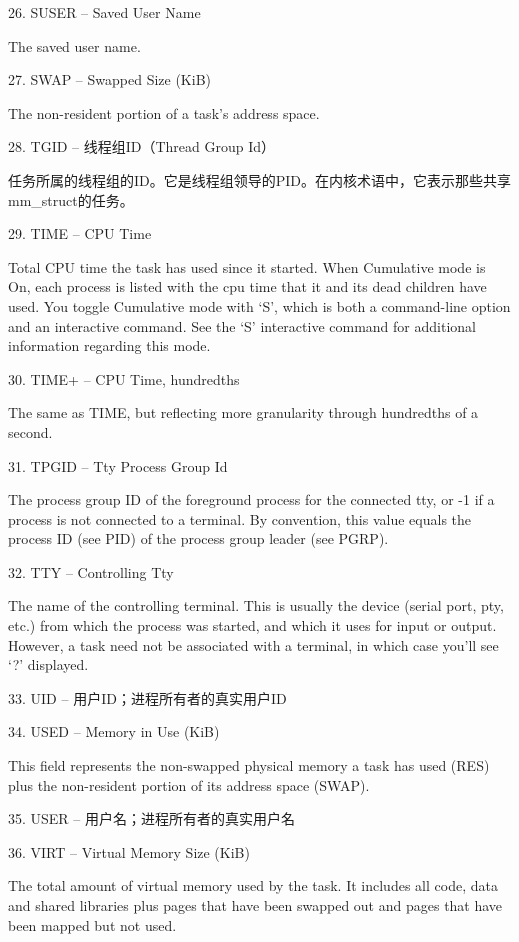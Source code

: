 26. SUSER  --  Saved User Name  \par
The saved user name.

27. SWAP  --  Swapped Size (KiB)    \par
The non-resident portion of a task's address space.

28. TGID  --  线程组ID（Thread Group Id） \par
\qquad 任务所属的线程组的ID。它是线程组领导的PID。在内核术语中，它表示那些共享mm\_struct的任务。

29. TIME  --  CPU Time  \par
Total CPU time the task has used since it started.  When Cumulative mode is On, each process is listed with the cpu time that it and its dead children have used.  You toggle Cumulative mode with `S', which is both a command-line option and an interactive
command.  See the `S' interactive command for additional information regarding this mode.

30. TIME+  --  CPU Time, hundredths \par
The same as TIME, but reflecting more granularity through hundredths of a second.

31. TPGID  --  Tty Process Group Id \par
The process group ID of the foreground process for the connected tty, or -1 if a process is not connected to a terminal.  By convention, this value equals the process ID (see PID) of the process group leader (see PGRP).

32. TTY  --  Controlling Tty    \par
The  name  of  the controlling terminal.  This is usually the device (serial port, pty, etc.) from which the process was started, and which it uses for input or output.  However, a task need not be associated with a terminal, in which case you'll see `?'
displayed.

33. UID  --  用户ID；进程所有者的真实用户ID   \par

34. USED  --  Memory in Use (KiB)   \par
This field represents the non-swapped physical memory a task has used (RES) plus the non-resident portion of its address space (SWAP).

35. USER  --  用户名；进程所有者的真实用户名  \par

36. VIRT  --  Virtual Memory Size (KiB) \par
The total amount of virtual memory used by the task.  It includes all code, data and shared libraries plus pages that have been swapped out and pages that have been mapped but not used.

